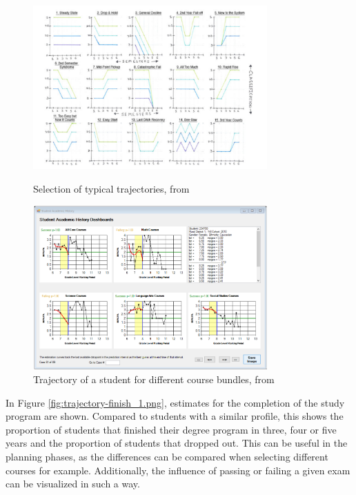 \begin{figure}
    \begin{minipage}[b]{0.48\textwidth}
        \centering
        \includegraphics[width=0.8\textwidth]{figures/trajectory_1.png}
        \caption{Selection of typical trajectories, from \cite{DegreePictures-Seed}}
        \label{fig:trajectory_1.png}
    \end{minipage}
    \hfill
    \begin{minipage}[b]{0.48\textwidth}
        \centering
        \includegraphics[width=0.8\textwidth]{figures/trajectory_2.png}
        \caption{Trajectory of a student for different course bundles, from \cite{Longitudinal-StudentPerformance}}
        \label{fig:trajectory_2.png}
    \end{minipage}
\end{figure}

In Figure \ref{fig:trajectory-finish_1.png}, estimates for the completion of the study program are shown. Compared to students with a similar profile, this shows the proportion of students that finished their degree program in three, four or five years and the proportion of students that dropped out. This can be useful in the planning phases, as the differences can be compared when selecting different courses for example. Additionally, the influence of passing or failing a given exam can be visualized in such a way.



